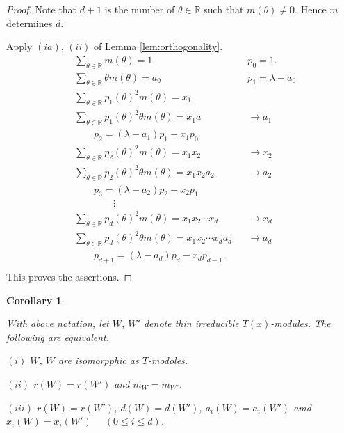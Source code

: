 \documentclass[
]{book}
\newtheorem{corollary}{Corollary}[chapter]
\theoremstyle{definition}
\theoremstyle{definition}
\theoremstyle{definition}
\theoremstyle{definition}
\theoremstyle{remark}
\begin{document}
\begin{proof}
Note that \(d+1\) is the number of \(\theta\in \mathbb{R}\) such that \(m(\theta)\neq 0\).
Hence \(m\) determines \(d\).

Apply \((ia)\), \((ii)\) of Lemma \ref{lem:orthogonality}.
\begin{align}
& \sum_{\theta\in\mathbb{R}}m(\theta) = 1 && p_0 =1.\\
& \sum_{\theta\in\mathbb{R}}\theta m(\theta) = a_0 && p_1 = \lambda - a_0\\
& \sum_{\theta\in\mathbb{R}}p_1(\theta)^2 m(\theta) = x_1 \\
& \sum_{\theta\in\mathbb{R}}p_1(\theta)^2\theta m(\theta) = x_1a && \to a_1\\
& \qquad p_2 = (\lambda - a_1)p_1 - x_1p_0\\
& \sum_{\theta\in\mathbb{R}}p_2(\theta)^2 m(\theta) = x_1x_2 && \to x_2\\
& \sum_{\theta\in\mathbb{R}}p_2(\theta)^2\theta m(\theta) = x_1x_2a_2 && \to a_2\\
& \qquad p_3 = (\lambda-a_2)p_2 - x_2p_1\\
& \qquad\qquad \vdots\\
& \sum_{\theta\in\mathbb{R}}p_d(\theta)^2 m(\theta) = x_1x_2\cdots x_d && \to x_d\\
& \sum_{\theta\in\mathbb{R}}p_d(\theta)^2\theta m(\theta) = x_1x_2\cdots x_da_d && \to a_d\\
& \qquad p_{d+1} = (\lambda-a_d)p_d - x_dp_{d-1}.\\
\end{align}
This proves the assertions.
\end{proof}

\begin{corollary}
\protect\hypertarget{cor:isomorphic}{}\label{cor:isomorphic}

With above notation, let
\(W\), \(W'\) denote thin irreducible \(T(x)\)-modules. The following are equivalent.

\((i)\) \(W\), \(W\) are isomorpphic as \(T\)-modoles.

\((ii)\) \(r(W) = r(W')\) and \(m_W = m_{W'}\).

\((iii)\) \(r(W) = r(W')\), \(d(W) = d(W')\), \(a_i(W) = a_i(W')\) amd \(x_i(W) = x_i(W')\) \(\quad (0\leq i\leq d)\).

\end{corollary}
\end{document}
